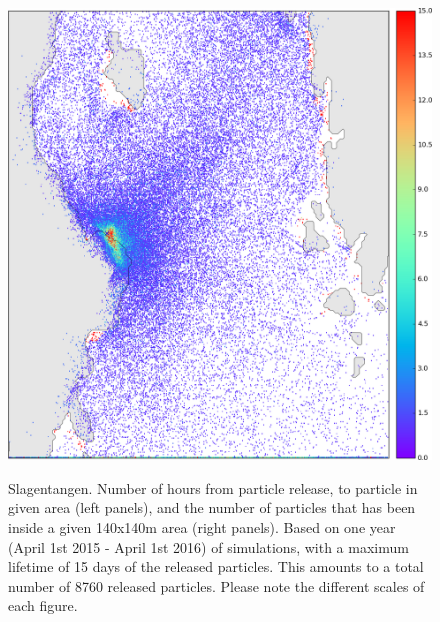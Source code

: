 \begin{figure}[ht]
{\includegraphics*[width=.5\textwidth]{Figurer/opendrift/opendrift_slagen_consentration_zoom_crop}
}
\caption{\small
Slagentangen. Number of hours from particle release, to particle in given area (left panels), and the number of particles that has been inside a given 140x140m area (right panels). Based on one year (April 1st 2015 - April 1st 2016) of simulations, with a maximum lifetime of 15 days of the released particles. This amounts to a total number of 8760 released particles. Please note the different scales of each figure.}
\label{fig:opendrift_slagen1}
\end{figure}

